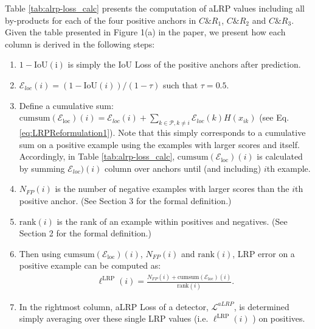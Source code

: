 \documentclass{article}
\begin{document}
Table \ref{tab:alrp-loss_calc} presents the computation of aLRP values including all by-products for each of the four positive anchors in $C \& R_1$, $C \& R_2$ and $C \& R_3$. Given the table presented in Figure 1(a) in the paper, we present how each column is derived in the following steps:
\begin{enumerate}
    \item $1-\mathrm{IoU(i)}$ is simply the IoU Loss of the positive anchors after prediction.
    \item $\mathcal{E}_{loc}(i) = (1-\mathrm{IoU}(i))/(1-\tau)$ such that $\tau=0.5$.
    \item Define a cumulative sum: $\mathrm{cumsum (\mathcal{E}_{loc})}(i) = \mathcal{E}_{loc}(i) +  \sum \limits_{k \in \mathcal{P}, k \neq i}  \mathcal{E}_{loc}(k) H(x_{ik})$ (see Eq. \ref{eq:LRPReformulation1}). Note that this simply corresponds to a cumulative sum on a positive example using the examples with larger scores and itself. Accordingly, in Table \ref{tab:alrp-loss_calc}, $\mathrm{cumsum (\mathcal{E}_{loc})}(i)$ is calculated by summing $\mathcal{E}_{loc})(i)$ column over anchors until (and including) $i$th example.
    \item $N_{FP}(i)$ is the number of negative examples with larger scores than the $i$th positive anchor. (See Section 3 for the formal definition.)
    \item $\mathrm{rank}(i)$ is the rank of an example within positives and negatives. (See Section 2 for the formal definition.)
    \item Then using $\mathrm{cumsum (\mathcal{E}_{loc})}(i)$, $N_{FP}(i)$ and $\mathrm{rank}(i)$, LRP error on a positive example can be computed as:
    \begin{align}
    \ell^{\mathrm{LRP}}(i) =  \frac{N_{FP}(i)+\mathrm{cumsum (\mathcal{E}_{loc})}(i)}{\mathrm{rank}(i)}.
    \end{align}
    \item In the rightmost column, aLRP Loss of a detector, $\mathcal{L}^{aLRP}$, is determined simply averaging over these single LRP values (i.e. $\ell^{\mathrm{LRP}}(i)$ ) on positives.
\end{enumerate}
\end{document}
